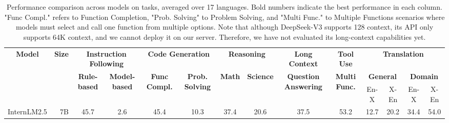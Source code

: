 \begin{table*}[ht]
    \caption{Performance comparison across models on \name tasks, averaged over 17 languages. Bold numbers indicate the best performance in each column. "Func Compl." refers to Function Completion, "Prob. Solving" to Problem Solving, and "Multi Func." to Multiple Functions scenarios where models must select and call one function from multiple options. Note that although DeepSeek-V3 supports 128 context, its API only supports 64K context, and we cannot deploy it on our server. Therefore, we have not evaluated its long-context capabilities yet.}
    \label{tab:main_results}
    \vskip 0.1in
    \centering
    \scriptsize
    \setlength{\tabcolsep}{3pt}
    \begin{tabular}{crcccccccccccc}
    \toprule
        \multirow{3}[2]{*}{\textbf{Model}} & \multirow{3}[2]{*}{\textbf{Size}} & \multicolumn{2}{c}{\textbf{Instruction Following}} & \multicolumn{2}{c}{\textbf{Code Generation}} & \multicolumn{2}{c}{\textbf{Reasoning}} & \textbf{Long Context} & \textbf{Tool Use} & \multicolumn{4}{c}{\textbf{Translation}} \\
        \cmidrule(lr){3-4}\cmidrule(lr){5-6}\cmidrule(lr){7-8}\cmidrule(lr){9-9}\cmidrule(lr){10-10}\cmidrule(lr){11-14}
        & & \multirow{2}{*}{\textbf{Rule-based}} & \multirow{2}{*}{\textbf{Model-based}} & \multirow{2}{*}{\textbf{Func Compl.}} & \multirow{2}{*}{\textbf{Prob. Solving}} & \multirow{2}{*}{\textbf{Math}} & \multirow{2}{*}{\textbf{Science}} & \multirow{2}{*}{\textbf{Question Answering}} & \multirow{2}{*}{\textbf{Multi Func.}} & \multicolumn{2}{c}{\textbf{General}} & \multicolumn{2}{c}{\textbf{Domain}} \\
        & & & & & & & & & & En-X & X-En & En-X & X-En \\
        \midrule
        \multirow{2}{*}{InternLM2.5}     & 7B  & 45.7 & 2.6  & 45.4 & 10.3 & 37.4 & 20.6 & 37.5 & 53.2 & 12.7 & 20.2 & 34.4 & 54.0 \\

\end{tabular}
\end{table*}
